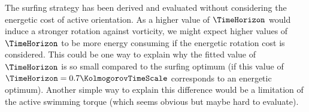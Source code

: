 The surfing strategy has been derived and evaluated without considering the energetic cost of active orientation.
As a higher value of $\TimeHorizon$ would induce a stronger rotation against vorticity, we might expect higher values of $\TimeHorizon$ to be more energy consuming if the energetic rotation cost is considered.
This could be one way to explain why the fitted value of $\TimeHorizon$ is so small compared to the surfing optimum (if this value of $\TimeHorizon = 0.7 \KolmogorovTimeScale$ corresponds to an energetic optimum).
Another simple way to explain this difference would be a limitation of the active swimming torque (which seems obvious but maybe hard to evaluate).
